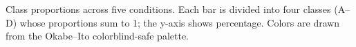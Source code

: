 \caption{Class proportions across five conditions. Each bar is divided into four classes (A--D) whose proportions sum to 1; the y-axis shows percentage. Colors are drawn from the Okabe--Ito colorblind-safe palette.}
